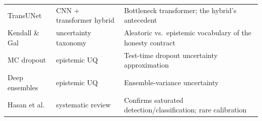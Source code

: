 \documentclass[conference]{IEEEtran}
\begin{document}
\begin{table}[!t]
\begin{tabular}{@{}p{2.0cm}p{2.0cm}p{3.6cm}@{}}
TransUNet \cite{transunet2021} & CNN + transformer hybrid & Bottleneck transformer; the hybrid's antecedent\\
Kendall \& Gal \cite{kendall2017} & uncertainty taxonomy & Aleatoric vs.\ epistemic vocabulary of the honesty contract\\
MC dropout \cite{mcdropout2016} & epistemic UQ & Test-time dropout uncertainty approximation\\
Deep ensembles \cite{deepensembles2017} & epistemic UQ & Ensemble-variance uncertainty\\
Hasan et al. \cite{hasan2025} & systematic review & Confirms saturated detection/classification; rare calibration\\
\bottomrule
\end{tabular}
\end{table}
\end{document}
